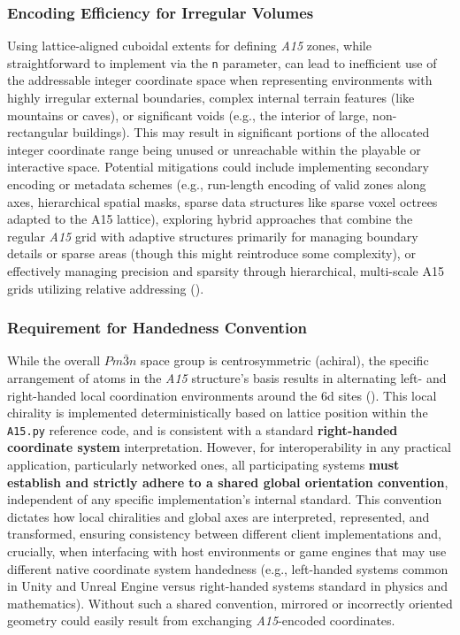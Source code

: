 \documentclass[10pt]{article}
\def\AAAB{\textit{A15}}
\begin{document}
\subsubsection{Encoding Efficiency for Irregular Volumes}\label{subsubsec-limits-complex}
Using lattice-aligned cuboidal extents for defining \AAAB{} zones, while straightforward to implement via the \texttt{n} parameter, can lead to inefficient use of the addressable integer coordinate space when representing environments with highly irregular external boundaries, complex internal terrain features (like mountains or caves), or significant voids (e.g., the interior of large, non-rectangular buildings). This may result in significant portions of the allocated integer coordinate range being unused or unreachable within the playable or interactive space. Potential mitigations could include implementing secondary encoding or metadata schemes (e.g., run-length encoding of valid zones along axes, hierarchical spatial masks, sparse data structures like sparse voxel octrees adapted to the A15 lattice), exploring hybrid approaches that combine the regular \AAAB{} grid with adaptive structures primarily for managing boundary details or sparse areas (though this might reintroduce some complexity), or effectively managing precision and sparsity through hierarchical, multi-scale A15 grids utilizing relative addressing ().

\subsubsection{Requirement for Handedness Convention}\label{subsubsec-limits-handedness}
While the overall $Pm\bar{3}n$ space group is centrosymmetric (achiral), the specific arrangement of atoms in the \AAAB{} structure's basis results in alternating left- and right-handed local coordination environments around the 6d sites (). This local chirality is implemented deterministically based on lattice position within the \texttt{A15.py} reference code, and is consistent with a standard \textbf{right-handed coordinate system} interpretation. However, for interoperability in any practical application, particularly networked ones, all participating systems \textbf{must establish and strictly adhere to a shared global orientation convention}, independent of any specific implementation's internal standard. This convention dictates how local chiralities and global axes are interpreted, represented, and transformed, ensuring consistency between different client implementations and, crucially, when interfacing with host environments or game engines that may use different native coordinate system handedness (e.g., left-handed systems common in Unity \cite{UnityCoords} and Unreal Engine \cite{UnrealCoords} versus right-handed systems standard in physics and mathematics). Without such a shared convention, mirrored or incorrectly oriented geometry could easily result from exchanging \AAAB{}-encoded coordinates.
\end{document}

